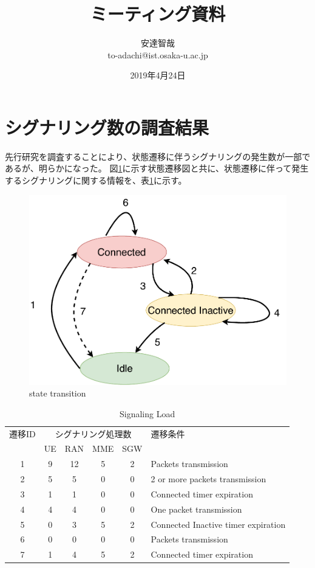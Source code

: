 \documentclass[a4j]{ujarticle}
\title{ミーティング資料}
\author{安達智哉\\to-adachi@ist.osaka-u.ac.jp}
\date{2019年4月24日}
\begin{document}
\maketitle


\section{シグナリング数の調査結果}
\label{sec:signalings}
先行研究を調査することにより、状態遷移に伴うシグナリングの発生数が一部であるが、明らかになった。
図\ref{state_id}に示す状態遷移図と共に、状態遷移に伴って発生するシグナリングに関する情報を、表\ref{table:signalings_all}に示す。

\begin{figure}[htbp]
  \centering
  \includegraphics[width=0.9\hsize]{state_id.pdf}
  \caption{state transition}
  \label{state_id}
\end{figure}

\begin{table}[htbp]
  \centering
  \caption{Signaling Load}
  \label{table:signalings_all}
  \begin{tabular}{c|cccc|l}
    \hline
    遷移ID  & \multicolumn{4}{|c|}{シグナリング処理数} & 遷移条件                          \\
            & UE      & RAN     & MME     & SGW      &                                   \\ \hline \hline
    1       & 9       & 12      & 5       & 2        & Packets transmission              \\
    2       & 5       & 5       & 0       & 0        & 2 or more packets transmission    \\
    3       & 1       & 1       & 0       & 0        & Connected timer expiration        \\
    4       & 4       & 4       & 0       & 0        & One packet transmission           \\
    5       & 0       & 3       & 5       & 2        & Connected Inactive timer expiration             \\
    6       & 0       & 0       & 0       & 0        & Packets transmission              \\
    7       & 1       & 4       & 5       & 2        & Connected timer expiration            \\ \hline
  \end{tabular}
\end{table}
\end{document}

